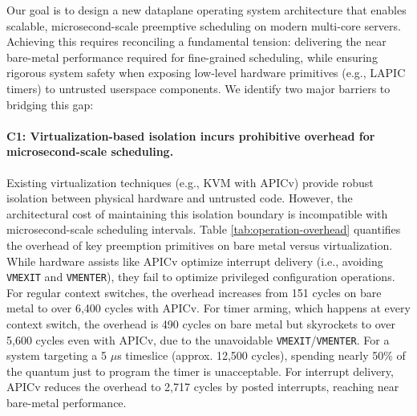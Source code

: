 Our goal is to design a new dataplane operating system architecture that enables scalable, microsecond-scale preemptive scheduling on modern multi-core servers.
Achieving this requires reconciling a fundamental tension: delivering the near bare-metal performance required for fine-grained scheduling, while ensuring rigorous system safety when exposing low-level hardware primitives (e.g., LAPIC timers) to untrusted userspace components.
We identify two major barriers to bridging this gap:

\paragraph{C1: Virtualization-based isolation incurs prohibitive overhead for microsecond-scale scheduling.}
Existing virtualization techniques (e.g., KVM with APICv) provide robust isolation between physical hardware and untrusted code.
However, the architectural cost of maintaining this isolation boundary is incompatible with microsecond-scale scheduling intervals.
Table \ref{tab:operation-overhead} quantifies the overhead of key preemption primitives on bare metal versus virtualization.
While hardware assists like APICv optimize interrupt delivery (i.e., avoiding \texttt{VMEXIT} and \texttt{VMENTER}), they fail to optimize privileged configuration operations.
For regular context switches, the overhead increases from 151 cycles on bare metal to over 6,400 cycles with APICv.
For timer arming, which happens at every context switch, the overhead is 490 cycles on bare metal but skyrockets to over 5,600 cycles even with APICv, due to the unavoidable \texttt{VMEXIT}/\texttt{VMENTER}.
For a system targeting a 5 $\mu$s timeslice (approx. 12,500 cycles), spending nearly 50\% of the quantum just to program the timer is unacceptable.
For interrupt delivery, APICv reduces the overhead to 2,717 cycles by posted interrupts, reaching near bare-metal performance.

